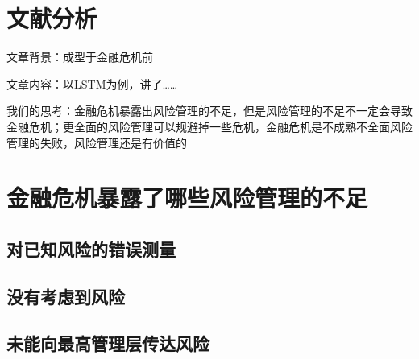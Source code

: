 \section{文献分析}

文章背景：成型于金融危机前

文章内容：以LSTM为例，讲了……

我们的思考：金融危机暴露出风险管理的不足，但是风险管理的不足不一定会导致金融危机；更全面的风险管理可以规避掉一些危机，金融危机是不成熟不全面风险管理的失败，风险管理还是有价值的

\section{金融危机暴露了哪些风险管理的不足}

\subsection{对已知风险的错误测量}\label{sec:1}

\subsection{没有考虑到风险}\label{sec:2}

\subsection{未能向最高管理层传达风险}\label{sec:3}
